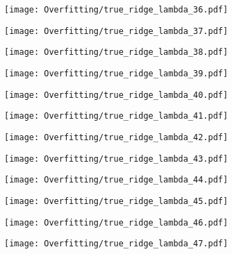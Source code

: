 \documentclass[xcolor=pdftex,dvipsnames,table]{beamer}
\begin{document}
\frame
{
	\begin{center}
		\texttt{[image: Overfitting/true\_ridge\_lambda\_36.pdf]}
	\end{center}
}

\frame
{
	\begin{center}
		\texttt{[image: Overfitting/true\_ridge\_lambda\_37.pdf]}
	\end{center}
}

\frame
{
	\begin{center}
		\texttt{[image: Overfitting/true\_ridge\_lambda\_38.pdf]}
	\end{center}
}

\frame
{
	\begin{center}
		\texttt{[image: Overfitting/true\_ridge\_lambda\_39.pdf]}
	\end{center}
}

\frame
{
	\begin{center}
		\texttt{[image: Overfitting/true\_ridge\_lambda\_40.pdf]}
	\end{center}
}

\frame
{
	\begin{center}
		\texttt{[image: Overfitting/true\_ridge\_lambda\_41.pdf]}
	\end{center}
}

\frame
{
	\begin{center}
		\texttt{[image: Overfitting/true\_ridge\_lambda\_42.pdf]}
	\end{center}
}

\frame
{
	\begin{center}
		\texttt{[image: Overfitting/true\_ridge\_lambda\_43.pdf]}
	\end{center}
}

\frame
{
	\begin{center}
		\texttt{[image: Overfitting/true\_ridge\_lambda\_44.pdf]}
	\end{center}
}

\frame
{
	\begin{center}
		\texttt{[image: Overfitting/true\_ridge\_lambda\_45.pdf]}
	\end{center}
}

\frame
{
	\begin{center}
		\texttt{[image: Overfitting/true\_ridge\_lambda\_46.pdf]}
	\end{center}
}

\frame
{
	\begin{center}
		\texttt{[image: Overfitting/true\_ridge\_lambda\_47.pdf]}
	\end{center}
}
\end{document}
